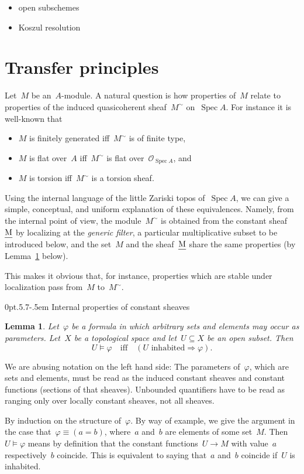 \documentclass[10pt,reqno,a4paper]{amsbook}
\makeatletter
\theoremstyle{definition}
\theoremstyle{plain}
\newtheorem{lemma}[defn]{Lemma}
\theoremstyle{remark}
\renewcommand{\O}{\mathcal{O}}
\let\oldul\ul
\renewcommand{\ul}[1]{\text{\oldul{$#1$}}}
\DeclareMathOperator{\Spec}{Spec}
\newcommand{\?}{\,{:}\,}
\renewcommand{\_}{\mathpunct{.}\,}
\renewenvironment{proof}[1][\proofname]{\par
  \pushQED{\qed}%
  \normalfont \topsep6\p@\@plus6\p@\relax
  \trivlist
  \item[\hskip\labelsep
        \itshape
    #1\@addpunct{.}]\ignorespaces
}{%
  \popQED\endtrivlist\@endpefalse
}
\def\subsection{\@startsection{subsection}{2}%
  {0pt}{.5\linespacing\@plus.7\linespacing}{-.5em}%
  {\normalfont\bfseries}}
\makeatother
\begin{document}
\begin{itemize}
\item open subschemes
\item Koszul resolution
\end{itemize}


\section{Transfer principles}
\label{sect:transfer-principles}

Let~$M$ be an~$A$-module. A natural question is how properties of~$M$
relate to properties of the induced quasicoherent sheaf~$M^\sim$
on~$\Spec A$. For instance it is well-known that
\begin{itemize}
\item $M$ is finitely generated iff~$M^\sim$ is of finite type,
\item $M$ is flat over~$A$ iff~$M^\sim$ is flat over~$\O_{\Spec A}$, and
\item $M$ is torsion iff~$M^\sim$ is a torsion sheaf.
\end{itemize}
Using the internal language of the little Zariski topos of~$\Spec A$, we can
give a simple, conceptual, and uniform explanation of these equivalences.
Namely, from the internal point of view, the module~$M^\sim$ is obtained from
the constant sheaf~$\ul{M}$ by localizing at the \emph{generic filter}, a
particular multiplicative subset to be introduced below, and the set~$M$ and
the sheaf~$\ul{M}$ share the same properties (by
Lemma~\ref{lemma:properties-of-constant-sheaves} below).

This makes it obvious that, for instance, properties which are stable under
localization pass from~$M$ to~$M^\sim$.


\subsection{Internal properties of constant sheaves}

\begin{lemma}\label{lemma:properties-of-constant-sheaves}Let~$\varphi$ be a
formula in which arbitrary sets and elements may occur as parameters. Let~$X$
be a topological space and let~$U \subseteq X$ be an open subset. Then
\[ U \models \varphi \quad\text{iff}\quad (\text{$U$ inhabited} \Rightarrow
\varphi). \]
\end{lemma}
We are abusing notation on the left hand side: The parameters
of~$\varphi$, which are sets and elements, must be read as the induced constant
sheaves and constant functions (sections of that sheaves).
Unbounded quantifiers have to be read as ranging only over locally constant
sheaves, not all sheaves.
\begin{proof}By induction on the structure of~$\varphi$. By way of example, we
give the argument in the case that~$\varphi \equiv (a = b)$, where~$a$ and~$b$ are
elements of some set~$M$. Then~$U \models \varphi$ means by definition that the
constant functions~$U \to M$ with value~$a$ respectively~$b$ coincide. This is
equivalent to saying that~$a$ and~$b$ coincide if~$U$ is inhabited.
\end{proof}
\end{document}
